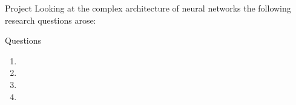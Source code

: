 \begin{frame}{Project}
	Looking at the complex architecture of neural networks the following research questions arose:
	\begin{block}{Questions}
		\begin{enumerate}
			\item \rqi
			\item \rqii
			\item \rqiii
			\item \rqiv
		\end{enumerate}
	\end{block}
\end{frame}